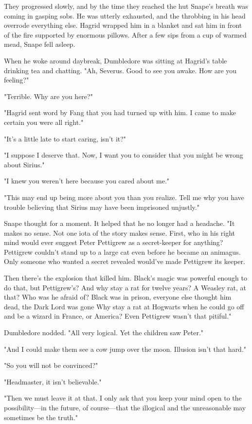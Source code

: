 They progressed slowly, and by the time they reached the hut Snape's breath was coming in gasping sobs. He was utterly exhausted, and the throbbing in his head overrode everything else. Hagrid wrapped him in a blanket and sat him in front of the fire supported by enormous pillows. After a few sips from a cup of warmed mead, Snape fell asleep.

When he woke around daybreak, Dumbledore was sitting at Hagrid's table drinking tea and chatting. "Ah, Severus. Good to see you awake. How are you feeling?"

"Terrible. Why are you here?"

"Hagrid sent word by Fang that you had turned up with him. I came to make certain you were all right."

"It's a little late to start caring, isn't it?"

"I suppose I deserve that. Now, I want you to consider that you might be wrong about Sirius."

"I knew you weren't here because you cared about me."

"This may end up being more about you than you realize. Tell me why you have trouble believing that Sirius may have been imprisoned unjustly."

Snape thought for a moment. It helped that he no longer had a headache. "It makes no sense. Not one iota of the story makes sense. First, who in his right mind would ever suggest Peter Pettigrew as a secret-keeper for anything? Pettigrew couldn't stand up to a large cat even before he became an animagus. Only someone who wanted a secret revealed would've made Pettigrew its keeper.

\textooquote Then there's the explosion that killed him. Black's magic was powerful enough to do that, but Pettigrew's? And why stay a rat for twelve years? A Weasley rat, at that? Who was he afraid of? Black was in prison, everyone else thought him dead, the Dark Lord was gone{\el} Why stay a rat at Hogwarts when he could go off and be a wizard in France, or America? Even Pettigrew wasn't that pitiful."

Dumbledore nodded. "All very logical. Yet the children saw Peter."

"And I could make them see a cow jump over the moon. Illusion isn't that hard."

"So you will not be convinced?"

"Headmaster, it isn't believable."

"Then we must leave it at that. I only ask that you keep your mind open to the possibility—in the future, of course—that the illogical and the unreasonable may sometimes be the truth."

